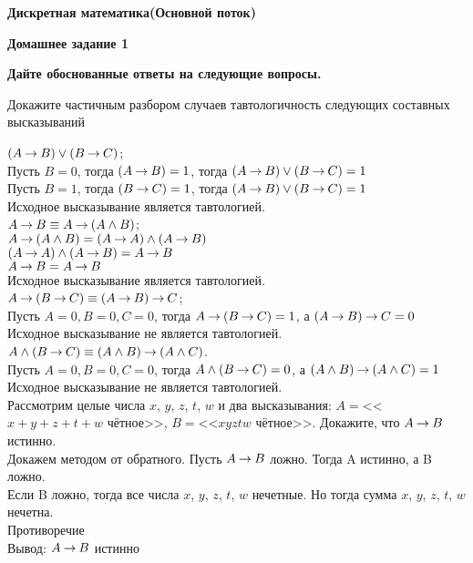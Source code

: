 \documentclass[11pt]{article}
\def\week{1}
\def\theproblem{К\week.\arabic{problem}}
\begin{document}
	\setcounter{problem}{0}
	\def\theproblem{Д\week.\arabic{problem}}
	{\textbf{\large Дискретная математика}\hfill \textbf{(Основной поток)}
		
		\medskip %
		
		\textbf{Домашнее задание \week}}
	
	\medskip
	
	\textbf{Дайте обоснованные ответы на следующие вопросы.}
	
	
	\vspace{5mm}
	
	
	\p Докажите частичным разбором случаев тавтологичность следующих
	составных высказываний
	
	\sp $(A\mathbin{\to} B)\lor (B\mathbin{\to} C)$;\\
	Пусть $B = 0$, тогда $ (A\mathbin{\to} B) = 1$, тогда $(A\mathbin{\to} B)\lor (B\mathbin{\to} C) = 1$\\
	Пусть $B = 1$, тогда $ (B\mathbin{\to} C) = 1$, тогда $(A\mathbin{\to} B)\lor (B\mathbin{\to} C) = 1$\\
	Исходное высказывание является тавтологией. \\
	
	\sp $A\mathbin{\to} B\equiv A\mathbin{\to} (A\land B)$;\\
	$A\mathbin{\to} (A\land B) = (A \mathbin{\to} A) \land (A \mathbin{\to} B)$\\
	$(A \mathbin{\to} A) \land (A \mathbin{\to} B) = A \mathbin{\to} B$\\
	$A \mathbin{\to} B = A \mathbin{\to} B$\\
	Исходное высказывание является тавтологией. \\
	
	\sp  $A\mathbin{\to} (B\mathbin{\to} C)\equiv(A\mathbin{\to} B)\mathbin{\to} C$;\\
	Пусть $A = 0, B = 0, C = 0$, тогда $A\mathbin{\to} (B\mathbin{\to} C) = 1$, а $(A\mathbin{\to} B)\mathbin{\to} C = 0$\\
	Исходное высказывание не является тавтологией.\\
	
	\sp $A\land (B\mathbin{\to} C)\equiv(A\land B)\mathbin{\to} (A\land C)$.\\
	Пусть $A = 0, B = 0, C = 0$, тогда $A\land (B\mathbin{\to} C) = 0$, а $(A\land B)\mathbin{\to} (A\land C) = 1$\\
	Исходное высказывание не является тавтологией.\\
	
	\p Рассмотрим целые числа $x$, $y$, $z$, $t$, $w$ и два высказывания:
	$A=$<<$x+y+z+t+w$ чётное>>,  $B=$<<$xyztw$ чётное>>. Докажите, что $A\mathbin{\to} B$ истинно. \\
	Докажем методом от обратного. Пусть $A\mathbin{\to} B$ ложно. Тогда A истинно, а B ложно.\\
	Если B ложно, тогда все числа  $x$, $y$, $z$, $t$, $w$ нечетные. Но тогда сумма  $x$, $y$, $z$, $t$, $w$ нечетна. \\
	Противоречие\\
	Вывод:  $A\mathbin{\to} B$ истинно\\
	
\end{document}

